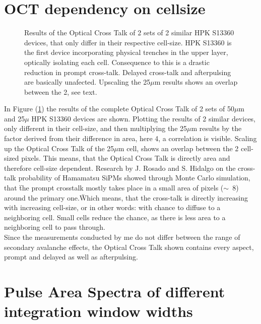 \documentclass[12pt,article,type=msc,colorback,accentcolor=tud9c]{tudthesis}
\begin{document}
{\section{OCT dependency on cellsize}
\label{appsec:OCT_Size}
\begin{figure}[h]
\begin{centering}
\caption{Results of the Optical Cross Talk of 2 sets of 2 similar HPK S13360 devices, that only differ in their respective cell-size. HPK S13360 is the first device incorporating physical trenches in the upper layer, optically isolating each cell. Consequence to this is a drastic reduction in prompt cross-talk. Delayed cross-talk and afterpulsing are basically unafected. Upscaling the 25$\mu$m results shows an overlap between the 2, see text.}
\label{fig:cell-size}
\end{centering}
\end{figure}
In Figure (\ref{fig:cell-size}) the results of the complete Optical Cross Talk of 2 sets of 50$\mu$m and 25$\mu$ HPK S13360 devices are shown. Plotting the results of 2 similar devices, only different in their cell-size, and then multiplying the 25$\mu$m results by the factor derived from their difference in area, here 4, a correlation is visible. Scaling up the Optical Cross Talk of the 25$\mu$m cell, shows an overlap between the 2 cell-sized pixels. This means, that the Optical Cross Talk is directly area and therefore cell-size dependent. Research by J. Rosado and S. Hidalgo \cite{ModelCTAP} on the cross-talk probability of Hamamatsu SiPMs showed through Monte Carlo simulation, that \"the prompt crosstalk mostly takes place in a small area of pixels ($\sim$~8) around the primary one.\" Which means, that the cross-talk is directly increasing with increasing cell-size, or in other words: with chance to diffuse to a neighboring cell. Small cells reduce the chance, as there is less area to a neighboring cell to pass through.\\
Since the measurements conducted by me do not differ between the range of secondary avalanche effects, the Optical Cross Talk shown contains every aspect, prompt and delayed as well as afterpulsing.

\clearpage
\section{Pulse Area Spectra of different integration window widths}
\label{appsec:PAS_window}

}
\end{document}
